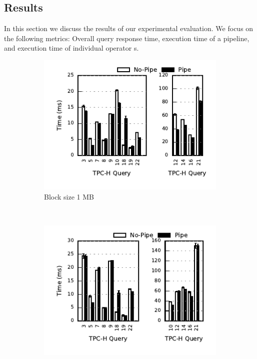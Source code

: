 \subsection{Results}
In this section we discuss the results of our experimental evaluation. 
We focus on the following metrics: Overall query response time, execution time of a pipeline, and execution time of individual operator \wo{}s.

\begin{figure}[t]
	\centering
	\begin{subfigure}[ht]{0.32\textwidth}
		\includegraphics[width=\textwidth]{pipeline/figures/first-consumer-comparison-1mb-withlip}	
		\caption{Block size 1 MB}
	\end{subfigure}
	~
	\begin{subfigure}[ht]{0.32\textwidth}
		\includegraphics[width=\textwidth]{pipeline/figures/first-consumer-comparison-2mb-withlip}	

\end{subfigure}
\end{figure}
